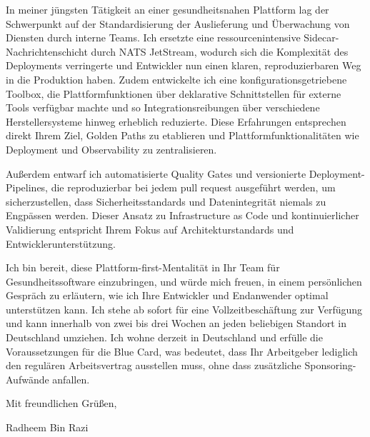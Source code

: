 \documentclass[11pt,a4paper]{coverletter}
\begin{document}
In meiner jüngsten Tätigkeit an einer gesundheitsnahen Plattform lag der Schwerpunkt auf der Standardisierung der Auslieferung und Überwachung von Diensten durch interne Teams. Ich ersetzte eine ressourcenintensive Sidecar-Nachrichtenschicht durch NATS JetStream, wodurch sich die Komplexität des Deployments verringerte und Entwickler nun einen klaren, reproduzierbaren Weg in die Produktion haben. Zudem entwickelte ich eine konfigurationsgetriebene Toolbox, die Plattformfunktionen über deklarative Schnittstellen für externe Tools verfügbar machte und so Integrationsreibungen über verschiedene Herstellersysteme hinweg erheblich reduzierte. Diese Erfahrungen entsprechen direkt Ihrem Ziel, Golden Paths zu etablieren und Plattformfunktionalitäten wie Deployment und Observability zu zentralisieren.

Außerdem entwarf ich automatisierte Quality Gates und versionierte Deployment-Pipelines, die reproduzierbar bei jedem pull request ausgeführt werden, um sicherzustellen, dass Sicherheitsstandards und Datenintegrität niemals zu Engpässen werden. Dieser Ansatz zu Infrastructure as Code und kontinuierlicher Validierung entspricht Ihrem Fokus auf Architekturstandards und Entwicklerunterstützung.

Ich bin bereit, diese Plattform-first-Mentalität in Ihr Team für Gesundheitssoftware einzubringen, und würde mich freuen, in einem persönlichen Gespräch zu erläutern, wie ich Ihre Entwickler und Endanwender optimal unterstützen kann. Ich stehe ab sofort für eine Vollzeitbeschäftung zur Verfügung und kann innerhalb von zwei bis drei Wochen an jeden beliebigen Standort in Deutschland umziehen. Ich wohne derzeit in Deutschland und erfülle die Voraussetzungen für die Blue Card, was bedeutet, dass Ihr Arbeitgeber lediglich den regulären Arbeitsvertrag ausstellen muss, ohne dass zusätzliche Sponsoring-Aufwände anfallen.

\closing{Mit freundlichen Grüßen,}{Radheem Bin Razi}
\end{document}
